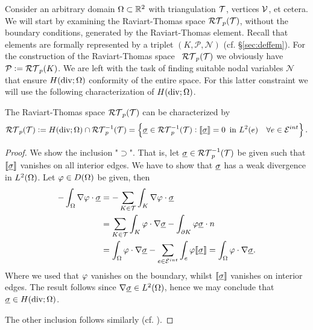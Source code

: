 \documentclass[thesis.tex]{subfiles}
\begin{document}
Consider an arbitrary domain $ \Omega \subset \mathbb{R}^2$ with triangulation $ \mathcal{T}$, vertices $ \mathcal{V}$, et cetera.
We will start by examining the Raviart-Thomas space $\mathcal{RT}_p( \mathcal{T})$, without the boundary conditions,
generated by the Raviart-Thomas element.
Recall that elements are formally represented by a triplet $(K, \mathcal{P}, \mathcal{N})$ (cf. \S\ref{sec:deffem}). For
the construction of the Raviart-Thomas space ~$\mathcal{RT}_p( \mathcal{T})$
we obviously have $\mathcal{P} := \mathcal{RT}_p(K)$.
We are left with the task of finding suitable nodal variables $\mathcal{N}$ that ensure $H(\operatorname{div};  \Omega)$ conformity of the entire space.
For this latter constraint we will use the following characterization of $H(\operatorname{div};  \Omega)$.
\begin{thm}
  \label{thm:rtjump}
  The Raviart-Thomas space $\mathcal{RT}_p( \mathcal{T})$  can be characterized by
  \[
    \mathcal{RT}_p( \mathcal{T}) := H(\operatorname{div};  \Omega) \cap \mathcal{RT}_p^{-1}( \mathcal{T})  = \set{\underline{\sigma}\in \mathcal{RT}_p^{-1}( \mathcal{T}) : \llbracket \underline{\sigma}\rrbracket = 0 \, \text{ in } L^2(e) \quad \forall e \in \mathcal{E}^{int}}.
  \]
\end{thm}
\begin{proof}
  We show the inclusion "$\supset$". That is, let $\underline{\sigma} \in \mathcal{RT}_p^{-1}( \mathcal{T})$ be given such that $\llbracket \underline{\sigma} \rrbracket$
  vanishes on all interior edges. We have to show that $\underline{\sigma}$ has a weak divergence in $L^2( \Omega)$.
  Let $\varphi \in D( \Omega)$ be given, then
  \begin{align*}
    - \int_{ \Omega}  \nabla \varphi \cdot \underline{\sigma} &= - \sum_{K \in  \mathcal{T}} \int_K \nabla \varphi \cdot \underline{\sigma} \\
    &=  \sum_{K \in  \mathcal{T}} \int_K \varphi \cdot \nabla \underline{\sigma} - \int_{\partial K} \varphi \underline{\sigma} \cdot n\\
    &=  \int_{ \Omega} \varphi \cdot \nabla \underline{\sigma} - \sum_{e \in  \mathcal{E}^{int}} \int_e \varphi \llbracket \underline{\sigma} \rrbracket = \int_{ \Omega} \varphi \cdot \nabla \underline{\sigma}.
  \end{align*}
  Where we used that $\varphi$ vanishes on the boundary, whilst $\llbracket \underline{\sigma} \rrbracket$ vanishes on interior edges.
  The result follows since $\nabla \underline{\sigma} \in L^2( \Omega)$, hence we may conclude that $\underline{\sigma} \in H(\operatorname{div};  \Omega)$.

  The other inclusion follows similarly (cf. \cite[Thm~3.2]{gaticasimple}).
\end{proof}
\end{document}
